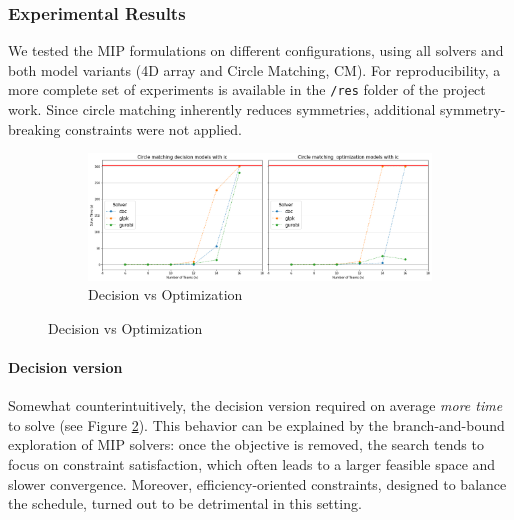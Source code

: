 \subsubsection{Experimental Results}
We tested the MIP formulations on different configurations, using all solvers and both model variants (4D array and Circle Matching, CM). 
For reproducibility, a more complete set of experiments is available in the \texttt{/res} folder of the project work. 
Since circle matching inherently reduces symmetries, additional symmetry-breaking constraints were not applied.


\begin{figure}[H]
    \centering
    \begin{subfigure}{\linewidth}
        \centering
        \includegraphics[width=\linewidth]{imgs/plot1.png}
        \caption{Decision vs Optimization}
        \label{fig:mip1}
    \end{subfigure}
\end{figure}

\paragraph{Decision version}
Somewhat counterintuitively, the decision version required on average \emph{more time} to solve (see Figure \ref{fig:mip1}). 
This behavior can be explained by the branch-and-bound exploration of MIP solvers: once the objective is removed, the search tends to focus on constraint satisfaction, which often leads to a larger feasible space and slower convergence.
Moreover, efficiency-oriented constraints, designed to balance the schedule, turned out to be detrimental in this setting.


